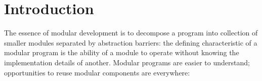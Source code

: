 \chapter{Introduction}
\label{sec:intro}
















The essence of modular development is to decompose a program into
collection of smaller modules separated by abstraction barriers: the
defining characteristic of a modular program is the ability of a module to
operate without knowing the implementation details of another.  Modular
programs are easier to understand; opportunities to reuse modular
components are everywhere:

